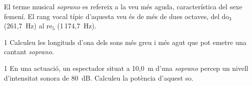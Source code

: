 El terme musical \textit{soprano} es refereix a la veu més aguda, característica del sexe femení. El rang vocal típic d'aquesta veu és de més de dues octaves, del do$_3$ (261,7~Hz) al re$_5$ (1\,174,7~Hz).

\begin{apartat}{1}
Calculeu les longituds d'ona dels sons més greu i més agut que pot emetre una cantant \textit{soprano}.
\end{apartat}

\begin{apartat}{1}
En una actuació, un espectador situat a 10,0~m d'una \textit{soprano} percep un nivell d'intensitat sonora de 80~dB. Calculeu la potència d'aquest so.
\end{apartat}

